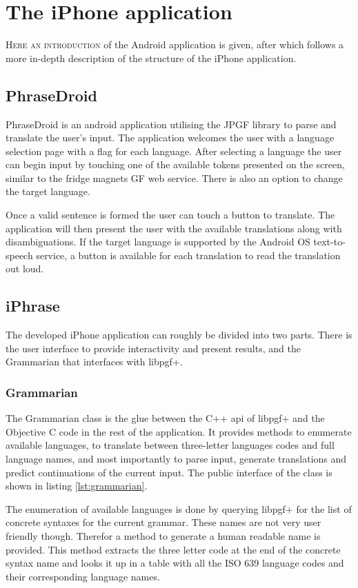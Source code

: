 \chapter{The iPhone application}
\lettrine[lines=4, loversize=-0.1, lraise=0.1]{H}{ere an introduction} of the Android application is given, after which follows a more in-depth description of the structure of the iPhone application.


\section{PhraseDroid}
PhraseDroid is an android application utilising the JPGF library to parse and translate the user's input. The application welcomes the user with a language selection page with a flag for each language. After selecting a language the user can begin input by touching one of the available tokens presented on the screen, similar to the fridge magnets GF web service. There is also an option to change the target language.

Once a valid sentence is formed the user can touch a button to translate. The application will then present the user with the available translations along with disambiguations. If the target language is supported by the Android OS text-to-speech service, a button is available for each translation to read the translation out loud.


\section{iPhrase}
The developed iPhone application can roughly be divided into two parts. There is the user interface to provide interactivity and present results, and the Grammarian that interfaces with libpgf+.


\subsection{Grammarian}
\label{sec:grammarian}
The Grammarian class is the glue between the C++ api of libpgf+ and the Objective C code in the rest of the application. It provides methods to enumerate available languages, to translate between three-letter languages codes and full language names, and most importantly to parse input, generate translations and predict continuations of the current input. The public interface of the class is shown in listing \ref{lst:grammarian}.

The enumeration of available languages is done by querying libpgf+ for the list of concrete syntaxes for the current grammar. These names are not very user friendly though. Therefor a method to generate a human readable name is provided. This method extracts the three letter code at the end of the concrete syntax name and looks it up in a table with all the ISO 639 \cite{iso639} language codes and their corresponding language names.

